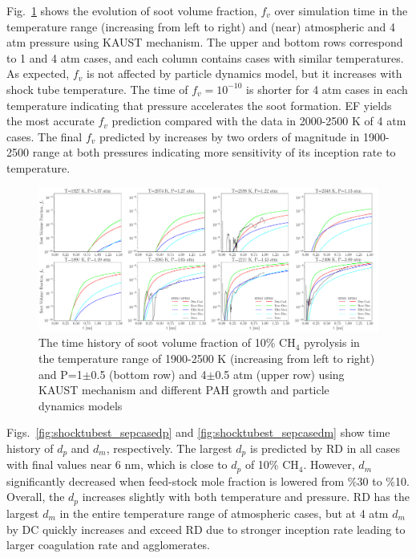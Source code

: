 Fig.~\ref{fig:shocktubest_sepcasevf} shows the evolution of soot volume fraction, $f_v$ over simulation time in the temperature range (increasing from left to right) and (near) atmospheric and 4 atm pressure using KAUST mechanism. The upper and bottom rows correspond to 1 and 4 atm cases, and each column contains cases with similar temperatures. As expected, $f_v$ is not affected by particle dynamics model, but it increases with shock tube temperature. The time of $f_v=10^{-10}$ is shorter for 4 atm cases in each temperature indicating that pressure accelerates the soot formation. EF yields the most accurate $f_v$ prediction compared with the data in 2000-2500 K of 4 atm cases. The final $f_v$ predicted by increases by two orders of magnitude in 1900-2500 range at both pressures indicating more sensitivity of its inception rate to temperature.


\begin{figure}[H]
	\centering
	\includegraphics[width=1\textwidth]{Figures/Results/Shocktube/Stanford/September/stsh_cases_vf.pdf}
	\caption{The time history of soot volume fraction of 10\% $\mathrm{CH_4}$ pyrolysis in the temperature range of 1900-2500 K (increasing from left to right) and P=1$\pm$0.5 (bottom row) and 4$\pm$0.5 atm (upper row) using KAUST mechanism and different PAH growth and particle dynamics models}
	\label{fig:shocktubest_sepcasevf} 
\end{figure}

Figs.~\ref{fig:shocktubest_sepcasedp} and \ref{fig:shocktubest_sepcasedm} show time history of $d_p$ and $d_m$, respectively. The largest $d_p$ is predicted by RD in all cases with final values near 6 nm, which is close to $d_p$ of 10\% $\mathrm{CH_4}$. However, $d_m$ significantly decreased when feed-stock mole fraction is lowered from \%30 to \%10. Overall, the $d_p$ increases slightly with both temperature and pressure. RD has the largest $d_m$ in the entire temperature range of atmospheric cases, but at 4 atm $d_m$ by DC quickly increases and exceed RD due to stronger inception rate leading to larger coagulation rate and agglomerates. 

